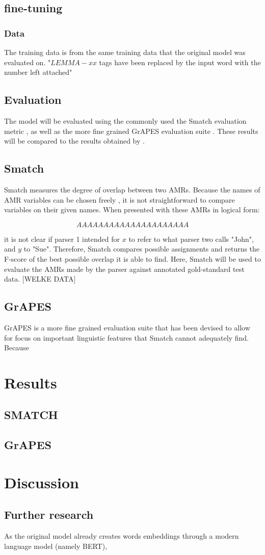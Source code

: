 \documentclass[twocolumn]{article}
\begin{document}
\subsection{fine-tuning}
\subsubsection{Data}
The training data is from the same training data that the original model was evaluated on. "$LEMMA-xx$ tags have been replaced by the input word with the number left attached" 
\subsection{Evaluation}
The model will be evaluated using the commonly used the Smatch evaluation metric \parencite{cai-knight-2013-smatch}, as well as the more fine grained GrAPES evaluation suite \parencite{GrAPES}. These results will be compared to the results obtained by \textcite{GrAPES}.
\subsection{Smatch}
Smatch measures the degree of overlap between two AMRs. Because the names of AMR variables can be chosen freely , it is not straightforward to compare variables on their given names. When presented with these AMRs in logical form:

$$AAAAAAAAAAAAAAAAAAAAA$$

it is not clear if parser 1 intended for $x$ to refer to what parser two calls "John", and $y$ to "Sue". Therefore, Smatch compares possible assignments and returns the F-score of the best possible overlap it is able to find. 
Here, Smatch will be used to evaluate the AMRs made by the parser against annotated gold-standard test data. [WELKE DATA]

\subsection{GrAPES}
GrAPES is a more fine grained evaluation suite that has been devised to allow for focus on important linguistic features that Smatch cannot adequately find. Because 

\section{Results}
\subsection{SMATCH}
\subsection{GrAPES}
\section{Discussion}
\subsection{Further research}
As the original model already creates words embeddings through a modern language model (namely BERT),

\printbibliography
\end{document}
